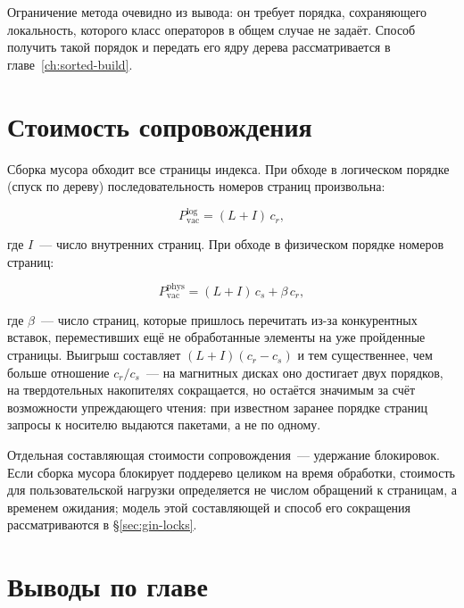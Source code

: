 Ограничение метода очевидно из вывода: он требует порядка, сохраняющего
локальность, которого класс операторов в общем случае не задаёт. Способ
получить такой порядок и передать его ядру дерева рассматривается в
главе~\ref{ch:sorted-build}.

\section{Стоимость сопровождения}

Сборка мусора обходит все страницы индекса. При обходе в логическом порядке
(спуск по дереву) последовательность номеров страниц произвольна:

\begin{equation}
\label{eq:vac-logical}
P_{\text{vac}}^{\text{log}} = (L + I)\, c_r ,
\end{equation}

где $I$~--- число внутренних страниц. При обходе в физическом порядке номеров
страниц:

\begin{equation}
\label{eq:vac-phys}
P_{\text{vac}}^{\text{phys}} = (L + I)\, c_s + \beta \, c_r ,
\end{equation}

где $\beta$~--- число страниц, которые пришлось перечитать из-за конкурентных
вставок, переместивших ещё не обработанные элементы на уже пройденные страницы.
Выигрыш составляет $(L+I)(c_r-c_s)$ и тем существеннее, чем больше отношение
$c_r/c_s$~--- на магнитных дисках оно достигает двух порядков, на твердотельных
накопителях сокращается, но остаётся значимым за счёт возможности
упреждающего чтения: при известном заранее порядке страниц запросы к носителю
выдаются пакетами, а не по одному.

Отдельная составляющая стоимости сопровождения~--- удержание блокировок.
Если сборка мусора блокирует поддерево целиком на время обработки, стоимость
для пользовательской нагрузки определяется не числом обращений к страницам, а
временем ожидания; модель этой составляющей и способ его сокращения
рассматриваются в §\ref{sec:gin-locks}.

\section{Выводы по главе}


